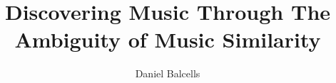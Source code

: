 \title{Discovering Music Through The Ambiguity of Music Similarity}
\author{Daniel Balcells}

\usepackage[latin1]{inputenc}
\usepackage{setspace}

\usepackage[english]{babel}

\usepackage[cam,a4,center,frame]{crop}

\usepackage{graphicx}

\usepackage{charter} %

\usepackage[
  bibstyle=authoryear-comp,
  citestyle=0-Misc/authoryearbrack,
  maxnames=1,
  hyperref=true,
  backref=true,
  backrefstyle=none,
  backend=bibtex,
  idemtracker=true
]{biblatex}

\usepackage[colorlinks=false]{hyperref}
\hypersetup{
    colorlinks,
    citecolor=black,
    filecolor=black,
    linkcolor=black,
    urlcolor=black
}


\pagestyle{plain}

\usepackage{makeidx}
\makeindex

\usepackage{fancyhdr}
\pagestyle{fancy}
\fancyfoot{}
\fancyfoot[RO]{\thepage}
\fancyfoot[LE]{\thepage}

\renewcommand{\thetable}{\arabic{section}.\arabic{table}}
\renewcommand{\thefigure}{\arabic{section}.\arabic{figure}}

\usepackage[toc,page]{appendix}